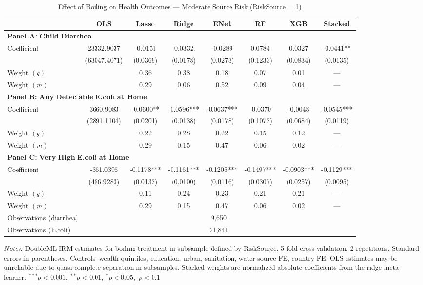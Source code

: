 \begin{table}[htbp]
\centering
\caption{Effect of Boiling on Health Outcomes --- Moderate Source Risk (RiskSource = 1)}
\label{tab:subgroup_risk1}
\begin{tabular}{lccccccc}
\toprule
 & OLS & Lasso & Ridge & ENet & RF & XGB & Stacked \\
\midrule
\multicolumn{8}{l}{\textbf{Panel A: Child Diarrhea}} \\
\midrule
Coefficient & 23332.9037 & -0.0151 & -0.0332. & -0.0289 & 0.0784 & 0.0327 & -0.0441** \\
 & (63047.4071) & (0.0369) & (0.0178) & (0.0273) & (0.1233) & (0.0834) & (0.0135) \\
Weight $(g)$ &  & 0.36 & 0.38 & 0.18 & 0.07 & 0.01 & --- \\
Weight $(m)$ &  & 0.29 & 0.06 & 0.52 & 0.09 & 0.04 & --- \\

\multicolumn{8}{l}{\textbf{Panel B: Any Detectable E.coli at Home}} \\
\midrule
Coefficient & 3660.9083 & -0.0600** & -0.0596*** & -0.0637*** & -0.0370 & -0.0048 & -0.0545*** \\
 & (2891.1104) & (0.0201) & (0.0138) & (0.0178) & (0.1073) & (0.0684) & (0.0119) \\
Weight $(g)$ &  & 0.22 & 0.28 & 0.22 & 0.15 & 0.12 & --- \\
Weight $(m)$ &  & 0.29 & 0.15 & 0.47 & 0.06 & 0.02 & --- \\

\multicolumn{8}{l}{\textbf{Panel C: Very High E.coli at Home}} \\
\midrule
Coefficient & -361.0396 & -0.1178*** & -0.1161*** & -0.1205*** & -0.1497*** & -0.0903*** & -0.1129*** \\
 & (486.9283) & (0.0133) & (0.0100) & (0.0116) & (0.0307) & (0.0257) & (0.0095) \\
Weight $(g)$ &  & 0.11 & 0.24 & 0.23 & 0.21 & 0.21 & --- \\
Weight $(m)$ &  & 0.29 & 0.15 & 0.47 & 0.06 & 0.02 & --- \\

\midrule
Observations (diarrhea) & \multicolumn{7}{c}{9,650} \\
Observations (E.coli) & \multicolumn{7}{c}{21,841} \\
\bottomrule
\end{tabular}
\begin{minipage}{\textwidth}
\footnotesize
\textit{Notes:} DoubleML IRM estimates for boiling treatment in subsample defined by RiskSource. 
5-fold cross-validation, 2 repetitions. Standard errors in parentheses. 
Controls: wealth quintiles, education, urban, sanitation, water source FE, country FE. 
OLS estimates may be unreliable due to quasi-complete separation in subsamples. 
Stacked weights are normalized absolute coefficients from the ridge meta-learner. 
$^{***}p<0.001$, $^{**}p<0.01$, $^{*}p<0.05$, $^{.}p<0.1$
\end{minipage}
\end{table}
